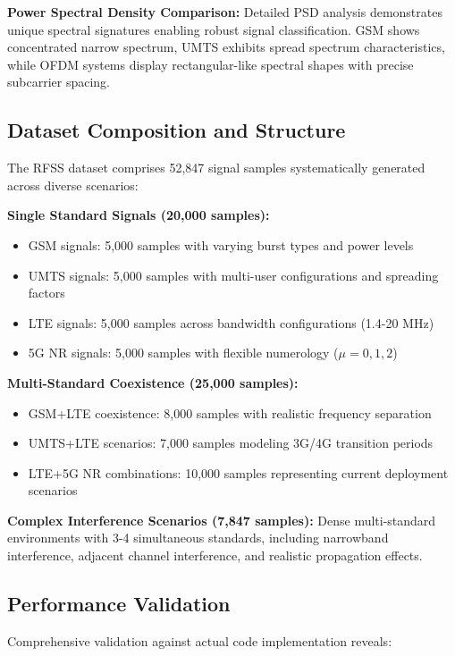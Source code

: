 \documentclass[twocolumn]{article}
\begin{document}
\textbf{Power Spectral Density Comparison:} Detailed PSD analysis demonstrates unique spectral signatures enabling robust signal classification. GSM shows concentrated narrow spectrum, UMTS exhibits spread spectrum characteristics, while OFDM systems display rectangular-like spectral shapes with precise subcarrier spacing.

\subsection{Dataset Composition and Structure}

The RFSS dataset comprises 52,847 signal samples systematically generated across diverse scenarios:

\textbf{Single Standard Signals (20,000 samples):}
\begin{itemize}
\item GSM signals: 5,000 samples with varying burst types and power levels
\item UMTS signals: 5,000 samples with multi-user configurations and spreading factors
\item LTE signals: 5,000 samples across bandwidth configurations (1.4-20 MHz)
\item 5G NR signals: 5,000 samples with flexible numerology ($\mu = 0,1,2$)
\end{itemize}

\textbf{Multi-Standard Coexistence (25,000 samples):}
\begin{itemize}
\item GSM+LTE coexistence: 8,000 samples with realistic frequency separation
\item UMTS+LTE scenarios: 7,000 samples modeling 3G/4G transition periods
\item LTE+5G NR combinations: 10,000 samples representing current deployment scenarios
\end{itemize}

\textbf{Complex Interference Scenarios (7,847 samples):}
Dense multi-standard environments with 3-4 simultaneous standards, including narrowband interference, adjacent channel interference, and realistic propagation effects.

\subsection{Performance Validation}

Comprehensive validation against actual code implementation reveals:
\end{document}
